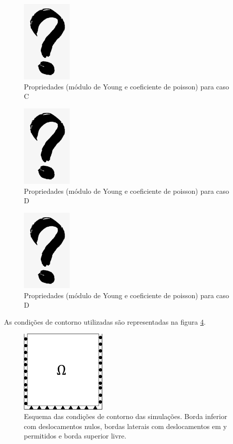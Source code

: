 \begin{figure}[!htbp]
    \label{fig:casoCgrid}
    \centering
    \includegraphics[height=4cm]{interrogacao.png}
    \caption{Propriedades (módulo de Young e coeficiente de poisson) para caso C }
\end{figure}


\begin{figure}[!htbp]
    \label{fig:casoDgrid}
    \centering
    \includegraphics[height=4cm]{interrogacao.png}
    \caption{Propriedades (módulo de Young e coeficiente de poisson) para caso D }
\end{figure}

\begin{figure}[!htbp]
    \label{fig:casoEgrid}
    \centering
    \includegraphics[height=4cm]{interrogacao.png}
    \caption{Propriedades (módulo de Young e coeficiente de poisson) para caso D }
    
\end{figure}


As condições de contorno utilizadas são representadas na figura \ref{fig:CondicoesContorno}. 

\begin{figure}[!htbp]
    \label{fig:CondicoesContorno}
    \centering
    \includegraphics[height=4cm]{chap08/figs/CondicoesContorno.png}
    \caption{Esquema das condições de contorno das simulações. Borda inferior com deslocamentos nulos, bordas laterais com deslocamentos em y permitidos e borda superior livre.}
\end{figure}


